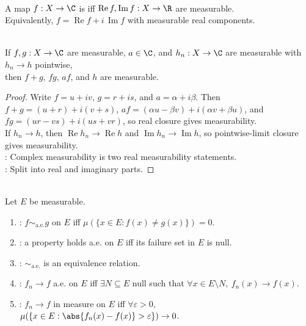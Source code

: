 \begin{definition} \label{def:complex-valued-measurable-functions} \\
A map $f:X\to\C$ is  iff $\operatorname{Re}f,\operatorname{Im}f:X\to\R$ are measurable.\\
Equivalently, $f=\operatorname{Re}f+i\,\operatorname{Im}f$ with measurable real components.
\end{definition}

\begin{proposition} \label{prop:complex-measurable-closure} \\
If $f,g:X\to\C$ are measurable, $a\in\C$, and $h_n:X\to\C$ are measurable with $h_n\to h$ pointwise,\\
then $f+g$, $fg$, $af$, and $h$ are measurable.
\begin{proof}
Write $f=u+iv$, $g=r+is$, and $a=\alpha+i\beta$. Then $f+g=(u+r)+i(v+s)$, $af=(\alpha u-\beta v)+i(\alpha v+\beta u)$, and $fg=(ur-vs)+i(us+vr)$, so real closure gives measurability.\\
If $h_n\to h$, then $\operatorname{Re}h_n\to\operatorname{Re}h$ and $\operatorname{Im}h_n\to\operatorname{Im}h$, so pointwise-limit closure gives measurability.\\
: Complex measurability is two real measurability statements.\\
: Split into real and imaginary parts.
\end{proof}
\end{proposition}

\begin{definition} \label{def:almost-everywhere-and-in-measure-convergence} \\
Let $E$ be measurable.
\begin{enumerate}[label=(\roman*)]
\setlength{\itemsep}{0pt}
\item {}: $f\sim_{\mathrm{a.e.}}g$ on $E$ iff $\mu(\{x\in E:f(x)\neq g(x)\})=0$.
\item {}: a property holds a.e. on $E$ iff its failure set in $E$ is null.
\item {}: $\sim_{\mathrm{a.e.}}$ is an equivalence relation.
\item {}: $f_n\to f$ a.e. on $E$ iff $\exists N\subseteq E$ null such that $\forall x\in E\setminus N,\ f_n(x)\to f(x)$.
\item {}: $f_n\to f$ in measure on $E$ iff $\forall\varepsilon>0$, $\mu(\{x\in E:\abs{f_n(x)-f(x)}>\varepsilon\})\to0$.
\end{enumerate}
\end{definition}

